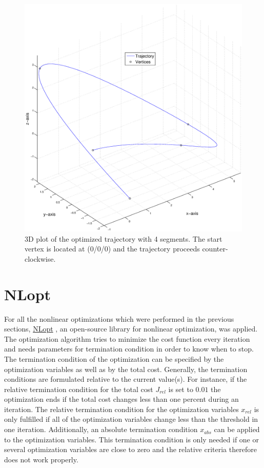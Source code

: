 \begin{figure}[H]
   \centering
   \includegraphics[trim = 30mm 30mm 33mm 30mm,clip,width=1\textwidth]{pics/4SegOptiSpace.eps}
   \caption{3D plot of the optimized trajectory with 4 segments. The start vertex is located at (0/0/0) and the trajectory proceeds counter-clockwise.}
    \label{pic:optiSpace} 
\end{figure}
\newpage


\section{NLopt}\label{sec:NLopt}

For all the nonlinear optimizations which were performed in the previous sections, \href{http://ab-initio.mit.edu/wiki/index.php/NLopt}{NLopt} \cite{NLopt}, an open-source library for nonlinear optimization, was applied. The optimization algorithm tries to minimize the cost function every iteration and needs parameters for termination condition in order to know when to stop.\newline
The termination condition of the optimization can be specified by the optimization variables as well as by the total cost. Generally, the termination conditions are formulated relative to the current value(s). For instance, if the relative termination condition for the total cost $J_{rel}$ is set to $0.01$ the optimization ends if the total cost changes less than one percent during an iteration. The relative termination condition for the optimization variables $x_{rel}$ is only fulfilled if all of the optimization variables change less than the threshold in one iteration.
Additionally, an absolute termination condition $x_{abs}$ can be applied to the optimization variables. This termination condition is only needed if one or several optimization variables are close to zero and the relative criteria therefore does not work properly. \newline 

